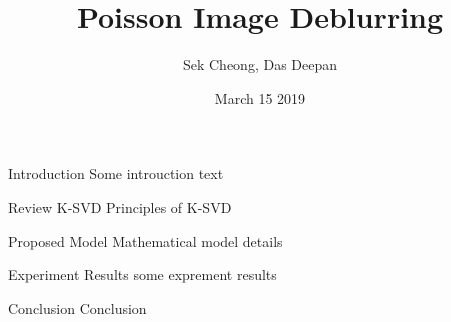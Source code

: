 \documentclass{beamer}
\title[Poisson Deblurring]{Poisson Image Deblurring}
\author{Sek Cheong, Das Deepan}
\institute{University of Wisconsin, Madison}
\date{March 15 2019}
\begin{document}
\begin{frame}
\titlepage
\end{frame}

\begin{frame}[t]{Introduction}
Some introuction text
\end{frame}

\begin{frame}[t]{Review K-SVD}
Principles of K-SVD 
\end{frame}

\begin{frame}[t]{Proposed Model}
Mathematical model details
\end{frame}

\begin{frame}[t]{Experiment Results}
some exprement results
\end{frame}

\begin{frame}[t]{Conclusion}
Conclusion
\end{frame}
\end{document}
